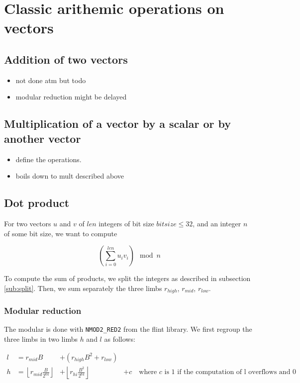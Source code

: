 \documentclass[a4paper]{article}
\begin{document}
\section{Classic arithemic operations on vectors}

\subsection{Addition of two vectors}

\begin{itemize}
    \item not done atm but todo 
    \item modular reduction might be delayed
\end{itemize}

\subsection{Multiplication of a vector by a scalar or by another vector}

\begin{itemize}
    \item define the operations.
    \item boils down to mult described above
\end{itemize}

\subsection{Dot product}

For two vectors $u$ and $v$ of $len$ integers of bit size $bitsize \le 32$, and an integer $n$ of some bit size, we want to compute

\[\left(\sum_{i=0}^{len}u_iv_i\right) \mod n\]

To compute the sum of products, we split the integers as described in subsection \ref{sub:split}. Then, we sum separately the three limbs $r_{high}$, $r_{mid}$, $r_{low}$. %

\subsubsection{Modular reduction}

The modular is done with \texttt{NMOD2\_RED2} from the flint library. We first regroup the three limbs in two limbs $h$ and $l$ as follows:

\begin{align}
    l &= r_{mid}B &+ \left(r_{high}B^2 + r_{low}\right) \\
    h &= \left\lfloor r_{mid}\frac{B}{2^{64}}\right\rfloor &+ \left\lfloor r_{hi}\frac{B^2}{2^{64}}\right\rfloor &+ c \quad{\text{where $c$ is $1$ if the computation of l overflows and 0 otherwise}}
\end{align}
\end{document}
